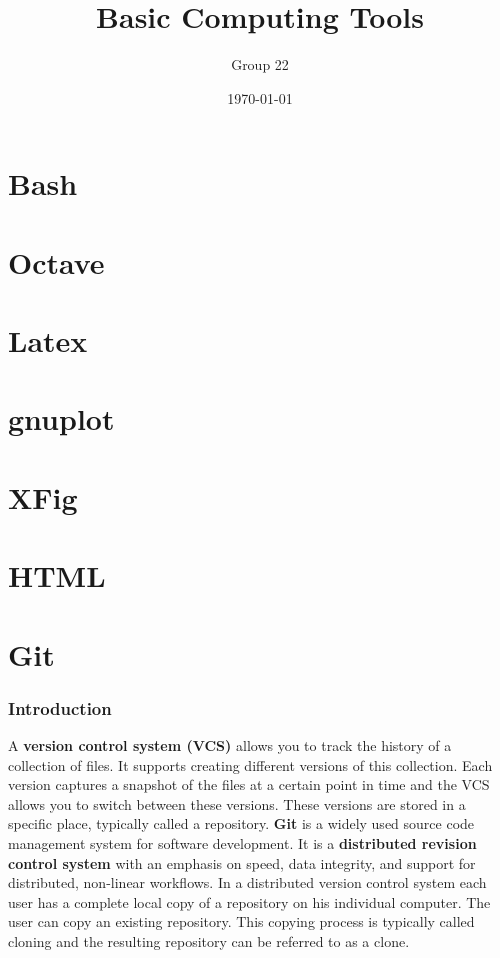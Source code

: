 \documentclass{beamer}
\author{ Group 22 }
\title{Basic Computing Tools}
\date{\today}
\begin{document}
\frame{\titlepage}
\section{Bash}
\section{Octave}
\section{Latex}
\section{gnuplot}
\section{XFig}
\section{HTML}

\section{Git}
\begin{frame}
\frametitle{Introduction}

A \textbf{version control system (VCS)} allows you to track the history of a collection of files. It supports creating different versions of this collection. Each version captures a snapshot of the files at a certain point in time and the VCS allows you to switch between these versions. These versions are stored in a specific place, typically called a repository.
	\textbf{Git} is a widely used source code management system for software development. It is a \textbf{distributed revision control system} with an emphasis on speed, data integrity, and support for distributed, non-linear workflows. In a distributed version control system each user has a complete local copy of a repository on his individual computer. The user can copy an existing repository. This copying process is typically called cloning and the resulting repository can be referred to as a clone.
\end{frame}
\end{document}

